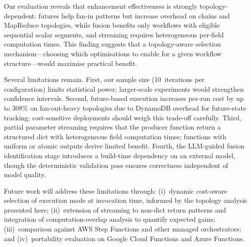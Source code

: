 \documentclass[runningheads]{llncs}
\begin{document}
Our evaluation reveals that enhancement effectiveness is strongly topology-dependent: futures help fan-in patterns but increase overhead on chains and MapReduce topologies, while fusion benefits only workflows with eligible sequential scalar segments, and streaming requires heterogeneous per-field computation times. This finding suggests that a topology-aware selection mechanism---choosing which optimisations to enable for a given workflow structure---would maximise practical benefit.

Several limitations remain. First, our sample size (10~iterations per configuration) limits statistical power; larger-scale experiments would strengthen confidence intervals. Second, future-based execution increases per-run cost by up to 308\% on fan-out-heavy topologies due to DynamoDB overhead for future-state tracking; cost-sensitive deployments should weigh this trade-off carefully. Third, partial parameter streaming requires that the producer function return a structured dict with heterogeneous field computation times; functions with uniform or atomic outputs derive limited benefit. Fourth, the LLM-guided fusion identification stage introduces a build-time dependency on an external model, though the deterministic validation pass ensures correctness independent of model quality.

Future work will address these limitations through: (i)~dynamic cost-aware selection of execution mode at invocation time, informed by the topology analysis presented here; (ii)~extension of streaming to non-dict return patterns and integration of computation-overlap analysis to quantify expected gains; (iii)~comparison against AWS Step Functions and other managed orchestrators; and (iv)~portability evaluation on Google Cloud Functions and Azure Functions.

%
%
%


%
\end{document}
